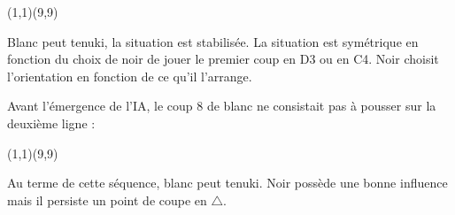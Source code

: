 \documentclass[preview, border=0pt, varwidth=false]{standalone}
\begin{document}
	\setgounit{0.4cm} 
	
\parbox[c][14.65cm][c]{10.2cm}{
	\centering
		
	
	\begin{psgopartialboard}{(1,1)(9,9)}
		\pass
		\pass*
	\end{psgopartialboard}
	
	\vspace{1em}
	Blanc peut tenuki, la situation est stabilisée. La situation est symétrique en fonction du choix de noir de jouer le premier coup en D3 ou en C4. Noir choisit l'orientation en fonction de ce qu'il l'arrange. 

	\smallskip

	Avant l'émergence de l'IA, le coup 8 de blanc ne consistait pas à pousser sur la deuxième ligne : 	
	
	\begin{psgopartialboard}{(1,1)(9,9)}
		\pass
		\pass*
	\end{psgopartialboard}

	Au terme de cette séquence, blanc peut tenuki. Noir possède une bonne influence mais il persiste un point de coupe en $\triangle$.
}
\end{document}

